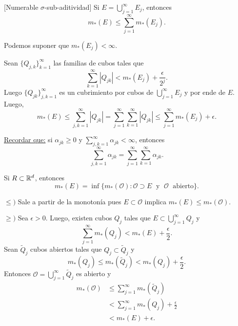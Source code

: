     \begin{observacion}{}[Numerable $\sigma$-sub-aditividad]
    Si $E=\bigcup\limits_{j=1}^{\infty} E_j$, entonces 
    \[m_{*}(E)\leq \sum\limits_{j=1}^{\infty} m_{*}(E_j).\]
    \begin{demo}
    Podemos suponer que $m_{*}(E_j)<\infty$.
    
    Sean  $\{Q_{j,k}\}_{k=1}^{\infty}$ las familias de cubos tales que 
    \[
    \sum\limits_{k=1}^{\infty} |Q_{jk}|<m_{*}(E_j)+\frac{\epsilon}{2^j}.
    \]
    Luego $\{Q_{jk}\}_{j, k=1}^{\infty}$ es un cubrimiento por cubos de $\bigcup\limits_{j=1}^{\infty} E_j$
    y por ende de $E$. 
    Luego, 
    \[
    m_{*}(E)\leq \sum\limits_{j,k=1}^{\infty} |Q_{jk}|=
    \sum\limits_{j=1}^{\infty} \sum\limits_{k=1}^{\infty} |Q_{jk}|
    \leq \sum\limits_{j=1}^{\infty} m_{*}(E_j)+\epsilon.
    \]
       \end{demo}
        \underline{Recordar que:} si $\alpha_{jk}\geq 0$ y $\sum\limits_{j,k=1}^{\infty} \alpha_{jk}<\infty$, entonces
    \[
    \sum\limits_{j,k=1}^{\infty} \alpha_{jk}=
    \sum\limits_{j=1}^{\infty} \sum\limits_{k=1}^{\infty}\alpha_{jk}.
    \]
    \end{observacion}
    
    \begin{observacion}{}
    Si $R\subset \mathbb{R}^d$, entonces
    \[
    m_{*}(E)=
    \inf\{
    m_{*}(\mathcal{O}): \mathcal{O}\supset E\;\mbox{ y }\;\mathcal{O}\;\mbox{ abierto} 
    \}.
    \]
    
    \begin{demo}
    $\leq)$
    Sale a partir de la monoton\'ia pues $E \subset \mathscr{O}$ implica $m_{*}(E)\leq m_{*}(\mathscr{O})$.
    
    $\geq)$
    Sea $\epsilon>0$. Luego, existen cubos  $Q_j$  tales que $E\subset \bigcup\limits_{j=1}^{\infty}Q_j$ y 
    \[
    \sum\limits_{j=1}^{\infty} m_{*}(Q_j)< m_{*}(E)+\frac{\epsilon}{2}.
    \]
    Sean $\widetilde{Q}_j$ cubos abiertos tales que $Q_j \subset \widetilde{Q}_j$ y 
    \[
    m_{*}(Q_j)\leq m_{*}(\widetilde{Q}_j)<m_{*}(Q_j)+\frac{\epsilon}{2}.
    \]
    Entonces 
    $\mathcal{O}=\bigcup\limits_{j=1}^{\infty} \widetilde{Q}_j$         es abierto y 
        \[
        \begin{split}
        m_{*}(\mathscr{O})
        &\leq \sum\limits_{j=1}^{\infty}m_{*}(\widetilde{Q}_j)
        \\
        &<  \sum\limits_{j=1}^{\infty} m_{*}(Q_j)+\frac{\epsilon}{2}
        \\
        &<m_{*}(E)+\epsilon.
        \end{split}
        \]
    \end{demo}
    \end{observacion}
    
